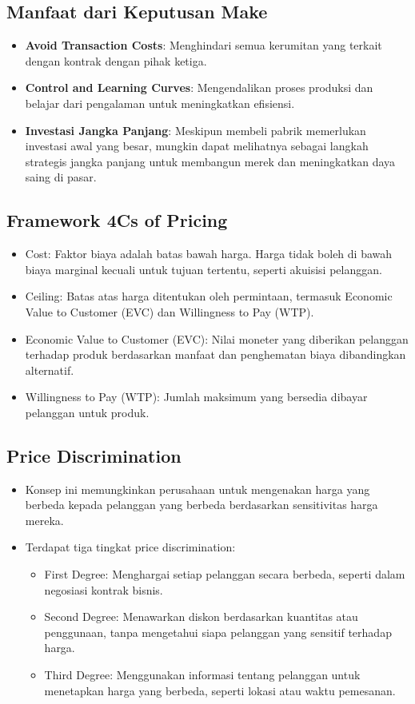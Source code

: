 \documentclass{article}
\begin{document}
\subsection{Manfaat dari Keputusan Make
}
\begin{itemize}
    \item \textbf{Avoid Transaction Costs}: Menghindari semua kerumitan yang terkait dengan kontrak dengan pihak ketiga.
    \item \textbf{Control and Learning Curves}: Mengendalikan proses produksi dan belajar dari pengalaman untuk meningkatkan efisiensi.
    \item \textbf{Investasi Jangka Panjang}: Meskipun membeli pabrik memerlukan investasi awal yang besar, mungkin dapat melihatnya sebagai langkah strategis jangka panjang untuk membangun merek dan meningkatkan daya saing di pasar.
\end{itemize}

\subsection{Framework 4Cs of Pricing}
\begin{itemize}
    \item Cost: Faktor biaya adalah batas bawah harga. Harga tidak boleh di bawah biaya marginal kecuali untuk tujuan tertentu, seperti akuisisi pelanggan.
    \item Ceiling: Batas atas harga ditentukan oleh permintaan, termasuk Economic Value to Customer (EVC) dan Willingness to Pay (WTP).
    \item Economic Value to Customer (EVC): Nilai moneter yang diberikan pelanggan terhadap produk berdasarkan manfaat dan penghematan biaya dibandingkan alternatif.
    \item Willingness to Pay (WTP): Jumlah maksimum yang bersedia dibayar pelanggan untuk produk.
\end{itemize}

\subsection{Price Discrimination}
\begin{itemize}
    \item Konsep ini memungkinkan perusahaan untuk mengenakan harga yang berbeda kepada pelanggan yang berbeda berdasarkan sensitivitas harga mereka.
    \item Terdapat tiga tingkat price discrimination:
          \begin{itemize}
              \item First Degree: Menghargai setiap pelanggan secara berbeda, seperti dalam negosiasi kontrak bisnis.
              \item Second Degree: Menawarkan diskon berdasarkan kuantitas atau penggunaan, tanpa mengetahui siapa pelanggan yang sensitif terhadap harga.
              \item Third Degree: Menggunakan informasi tentang pelanggan untuk menetapkan harga yang berbeda, seperti lokasi atau waktu pemesanan.
          \end{itemize}
\end{itemize}
\end{document}
